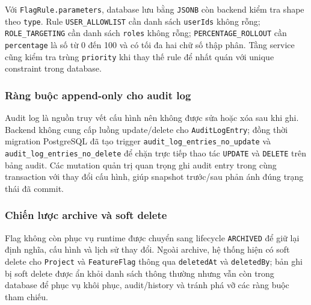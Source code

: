 Với \texttt{FlagRule.parameters}, database lưu bằng \texttt{JSONB} còn backend kiểm tra shape theo \texttt{type}. Rule \texttt{USER\_ALLOWLIST} cần danh sách \texttt{userIds} không rỗng; \texttt{ROLE\_TARGETING} cần danh sách \texttt{roles} không rỗng; \texttt{PERCENTAGE\_ROLLOUT} cần \texttt{percentage} là số từ 0 đến 100 và có tối đa hai chữ số thập phân. Tầng service cũng kiểm tra trùng \texttt{priority} khi thay thế rule để nhất quán với unique constraint trong database.

\subsubsection{Ràng buộc append-only cho audit log}

Audit log là nguồn truy vết cấu hình nên không được sửa hoặc xóa sau khi ghi. Backend không cung cấp luồng update/delete cho \texttt{AuditLogEntry}; đồng thời migration PostgreSQL đã tạo trigger \texttt{audit\_log\_entries\_no\_update} và \texttt{audit\_log\_entries\_no\_delete} để chặn trực tiếp thao tác \texttt{UPDATE} và \texttt{DELETE} trên bảng audit. Các mutation quản trị quan trọng ghi audit entry trong cùng transaction với thay đổi cấu hình, giúp snapshot trước/sau phản ánh đúng trạng thái đã commit.

\subsubsection{Chiến lược archive và soft delete}

Flag không còn phục vụ runtime được chuyển sang lifecycle \texttt{ARCHIVED} để giữ lại định nghĩa, cấu hình và lịch sử thay đổi. Ngoài archive, hệ thống hiện có soft delete cho \texttt{Project} và \texttt{FeatureFlag} thông qua \texttt{deletedAt} và \texttt{deletedBy}; bản ghi bị soft delete được ẩn khỏi danh sách thông thường nhưng vẫn còn trong database để phục vụ khôi phục, audit/history và tránh phá vỡ các ràng buộc tham chiếu.
